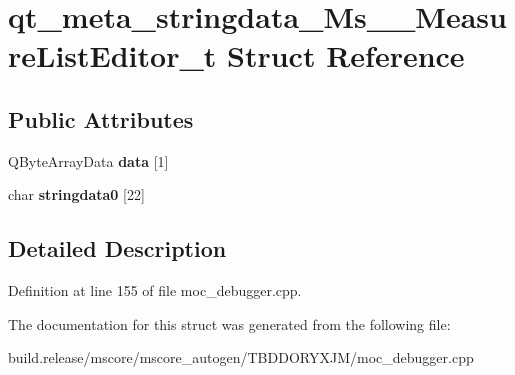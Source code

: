 \hypertarget{structqt__meta__stringdata___ms_____measure_list_editor__t}{}\section{qt\+\_\+meta\+\_\+stringdata\+\_\+\+Ms\+\_\+\+\_\+\+Measure\+List\+Editor\+\_\+t Struct Reference}
\label{structqt__meta__stringdata___ms_____measure_list_editor__t}
\subsection*{Public Attributes}
\begin{DoxyCompactItemize}
\item 
\mbox{\label{structqt__meta__stringdata___ms_____measure_list_editor__t_a58f5d92a0c90f96a7c5b2487baa8ba8c}} 
Q\+Byte\+Array\+Data {\bfseries data} \mbox{[}1\mbox{]}
\item 
\mbox{\label{structqt__meta__stringdata___ms_____measure_list_editor__t_af949cfd4c41214a682363e82298f267e}} 
char {\bfseries stringdata0} \mbox{[}22\mbox{]}
\end{DoxyCompactItemize}


\subsection{Detailed Description}


Definition at line 155 of file moc\+\_\+debugger.\+cpp.



The documentation for this struct was generated from the following file\+:\begin{DoxyCompactItemize}
\item 
build.\+release/mscore/mscore\+\_\+autogen/\+T\+B\+D\+D\+O\+R\+Y\+X\+J\+M/moc\+\_\+debugger.\+cpp\end{DoxyCompactItemize}
